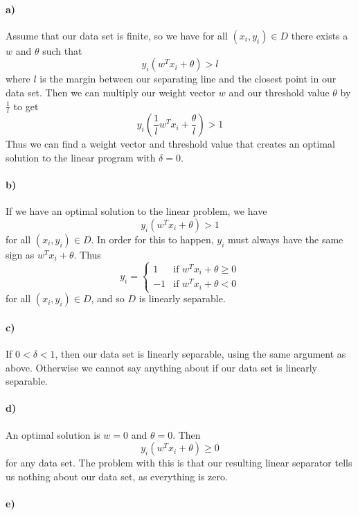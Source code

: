 \documentclass[12pt]{article}
\begin{document}
\paragraph{a)}

Assume that our data set is finite, so we have for all \((x_i,y_i)\in D\) there exists a \(w\) and \(\theta\) such that
\[y_i(w^Tx_i+\theta)>l\]
where \(l\) is the margin between our separating line and the closest point in our data set. Then we can multiply our
weight vector \(w\) and our threshold value \(\theta\) by \(\frac{1}{l}\) to get
\[y_i\left(\frac{1}{l}w^Tx_i+\frac{\theta}{l}\right)>1\]
Thus we can find a weight vector and threshold value that creates an optimal solution to the linear program with \(\delta=0\).

\paragraph{b)}

If we have an optimal solution to the linear problem, we have
\[y_i\left(w^Tx_i+\theta\right)>1\]
for all \((x_i,y_i)\in D\). In order for this to happen, \(y_i\) must always have the same sign as \(w^Tx_i+\theta\). Thus
\[y_i=\begin{cases}
        1 & \text{if }w^Tx_i+\theta\geq 0\\
        -1 & \text{if }w^Tx_i+\theta<0
\end{cases}\]
for all \((x_i,y_i)\in D\), and so \(D\) is linearly separable.

\paragraph{c)}

If \(0<\delta<1\), then our data set is linearly separable, using the same argument as above. Otherwise we cannot say anything about
if our data set is linearly separable.

\paragraph{d)}

An optimal solution is \(w=0\) and \(\theta=0\). Then
\[y_i(w^Tx_i+\theta)\geq 0\]
for any data set. The problem with this is that our resulting linear separator tells us nothing about our data set, as everything is
zero.

\paragraph{e)}
\end{document}
